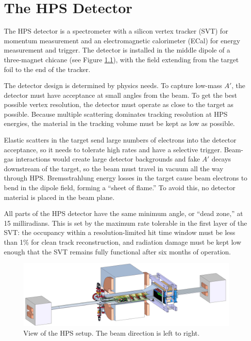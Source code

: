 \chapter{The HPS Detector}

The HPS detector is a spectrometer with a silicon vertex tracker (SVT) for momentum measurement and an electromagnetic calorimeter (ECal) for energy measurement and trigger.
The detector is installed in the middle dipole of a three-magnet chicane (see Figure \ref{fig:hps-pic}), with the field extending from the target foil to the end of the tracker.

The detector design is determined by physics needs.
To capture low-mass $A'$, the detector must have acceptance at small angles from the beam.
To get the best possible vertex resolution, the detector must operate as close to the target as possible.
Because multiple scattering dominates tracking resolution at HPS energies, the material in the tracking volume must be kept as low as possible.

Elastic scatters in the target send large numbers of electrons into the detector acceptance, so it needs to tolerate high rates and have a selective trigger.
Beam-gas interactions would create large detector backgrounds and fake $A'$ decays downstream of the target, so the beam must travel in vacuum all the way through HPS.
Bremsstrahlung energy losses in the target cause beam electrons to bend in the dipole field, forming a ``sheet of flame.'' To avoid this, no detector material is placed in the beam plane.

All parts of the HPS detector have the same minimum angle, or ``dead zone,'' at 15 milliradians.
This is set by the maximum rate tolerable in the first layer of the SVT: the occupancy within a resolution-limited hit time window must be less than 1\% for clean track reconstruction, and radiation damage must be kept low enough that the SVT remains fully functional after six months of operation.

\begin{figure}[ht]
    \includegraphics[width=\textwidth]{detector/figs/HPS-pic}
    \caption{View of the HPS setup.
    The beam direction is left to right.}
    \label{fig:hps-pic}
\end{figure}

